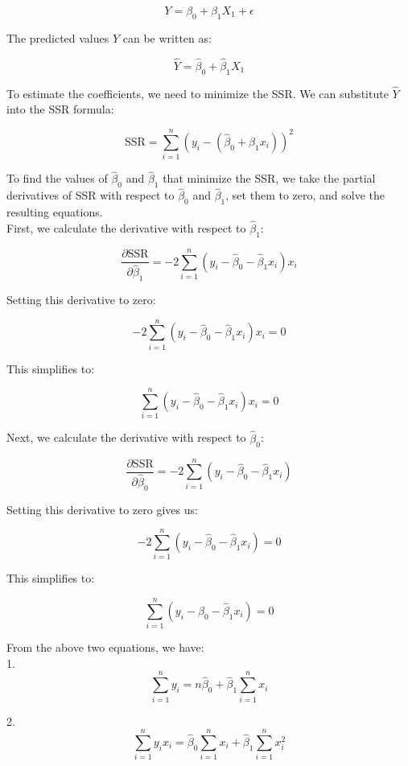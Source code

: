 \[
Y = \beta_0 + \beta_1 X_1 + \epsilon
\]

The predicted values \(\hat{Y}\) can be written as:

\[
\hat{Y} = \hat{\beta}_0 + \hat{\beta}_1 X_1
\]

To estimate the coefficients, we need to minimize the SSR. We can substitute \(\hat{Y}\) into the SSR formula:

\[
\text{SSR} = \sum_{i=1}^{n} \left( y_i - \left( \hat{\beta}_0 + \hat{\beta}_1 x_{i} \right) \right)^2
\]

To find the values of \(\hat{\beta}_0\) and \(\hat{\beta}_1\) that minimize the SSR, we take the partial derivatives of SSR with respect to \(\hat{\beta}_0\) and \(\hat{\beta}_1\), set them to zero, and solve the resulting equations.\\

First, we calculate the derivative with respect to \(\hat{\beta}_1\):

\[
\frac{\partial \text{SSR}}{\partial \hat{\beta}_1} = -2 \sum_{i=1}^{n} (y_i - \hat{\beta}_0 - \hat{\beta}_1 x_i) x_i
\]

Setting this derivative to zero:

\[
-2 \sum_{i=1}^{n} (y_i - \hat{\beta}_0 - \hat{\beta}_1 x_i) x_i = 0
\]

This simplifies to:

\[
\sum_{i=1}^{n} (y_i - \hat{\beta}_0 - \hat{\beta}_1 x_i) x_i = 0
\]

\vspace{8pt}
Next, we calculate the derivative with respect to \(\hat{\beta}_0\):

\[
\frac{\partial \text{SSR}}{\partial \hat{\beta}_0} = -2 \sum_{i=1}^{n} (y_i - \hat{\beta}_0 - \hat{\beta}_1 x_i)
\]

Setting this derivative to zero gives us:

\[
-2 \sum_{i=1}^{n} (y_i - \hat{\beta}_0 - \hat{\beta}_1 x_i) = 0
\]

This simplifies to:

\[
\sum_{i=1}^{n} (y_i - \hat{\beta}_0 - \hat{\beta}_1 x_i) = 0
\]

From the above two equations, we have:\\

1. 
\[
\sum_{i=1}^{n} y_i = n\hat{\beta}_0 + \hat{\beta}_1 \sum_{i=1}^{n} x_i 
\]

2. 
\[
\sum_{i=1}^{n} y_i x_i = \hat{\beta}_0 \sum_{i=1}^{n} x_i + \hat{\beta}_1 \sum_{i=1}^{n} x_i^2
\]


